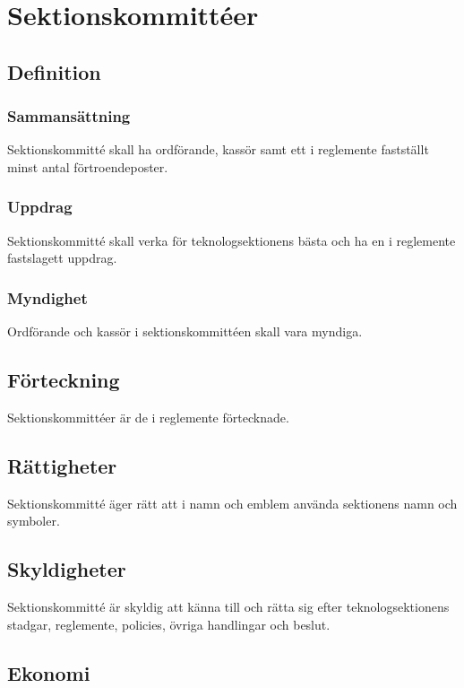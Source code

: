 \section{Sektionskommittéer}

\subsection{Definition}

\subsubsection{Sammansättning}
Sektionskommitté skall ha ordförande, kassör samt ett i reglemente fastställt minst antal förtroendeposter.

\subsubsection{Uppdrag}
Sektionskommitté skall verka för teknologsektionens bästa och ha en i reglemente fastslagett uppdrag.

\subsubsection{Myndighet}
Ordförande och kassör i sektionskommittéen skall vara myndiga.

\subsection{Förteckning}

Sektionskommittéer är de i reglemente förtecknade.

\subsection{Rättigheter}

Sektionskommitté äger rätt att i namn och emblem använda sektionens namn och symboler.

\subsection{Skyldigheter}

Sektionskommitté är skyldig att känna till och rätta sig efter teknologsektionens stadgar, reglemente, policies, övriga handlingar och beslut.

\subsection{Ekonomi}
